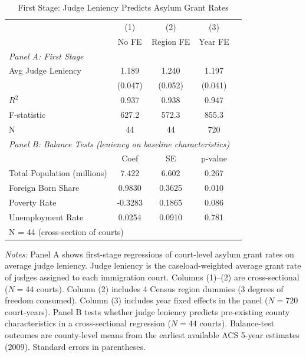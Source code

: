 \begin{table}[htbp]
\centering
\caption{First Stage: Judge Leniency Predicts Asylum Grant Rates}
\label{tab:first_stage}
\begin{tabular}{lcccc}
\toprule
 & (1) & (2) & (3) \\
 & No FE & Region FE & Year FE \\
\midrule
\multicolumn{4}{l}{\textit{Panel A: First Stage}} \\
Avg Judge Leniency & 1.189 & 1.240 & 1.197 \\
 & (0.047) & (0.052) & (0.041) \\
$R^2$ & 0.937 & 0.938 & 0.947 \\
F-statistic & 627.2 & 572.3 & 855.3 \\
N & 44 & 44 & 720 \\
\midrule
\multicolumn{4}{l}{\textit{Panel B: Balance Tests (leniency on baseline characteristics)}} \\
 & Coef & SE & p-value \\
Total Population (millions) & 7.422 & 6.602 & 0.267 \\
Foreign Born Share & 0.9830 & 0.3625 & 0.010 \\
Poverty Rate & -0.3283 & 0.1865 & 0.086 \\
Unemployment Rate & 0.0254 & 0.0910 & 0.781 \\
\multicolumn{4}{l}{N = 44 (cross-section of courts)} \\
\bottomrule
\end{tabular}
\begin{minipage}{0.85\textwidth}
\vspace{0.5em}
\footnotesize \textit{Notes:} Panel A shows first-stage regressions of court-level asylum grant rates
on average judge leniency. Judge leniency is the caseload-weighted average grant rate of judges
assigned to each immigration court. Columns (1)--(2) are cross-sectional ($N = 44$ courts). Column (2) includes
4 Census region dummies (3 degrees of freedom consumed).
Column (3) includes year fixed effects in the panel ($N = 720$ court-years).
Panel B tests whether judge leniency predicts pre-existing
county characteristics in a cross-sectional regression ($N = 44$ courts).
Balance-test outcomes are county-level means from the earliest available ACS 5-year estimates (2009).
Standard errors in parentheses.
\end{minipage}
\end{table}
